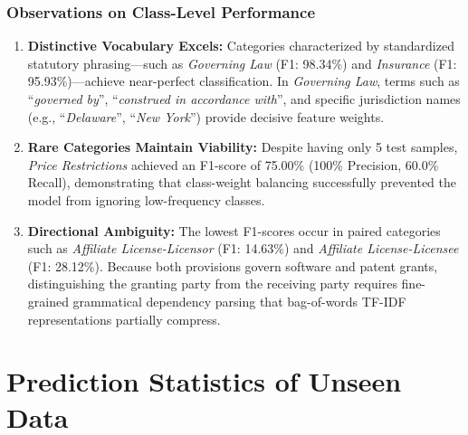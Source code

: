 \subsubsection*{Observations on Class-Level Performance}
\begin{enumerate}
    \item \textbf{Distinctive Vocabulary Excels:} Categories characterized by standardized statutory phrasing—such as \textit{Governing Law} (F1: 98.34\%) and \textit{Insurance} (F1: 95.93\%)—achieve near-perfect classification. In \textit{Governing Law}, terms such as ``\textit{governed by}'', ``\textit{construed in accordance with}'', and specific jurisdiction names (e.g., ``\textit{Delaware}'', ``\textit{New York}'') provide decisive feature weights.
    \item \textbf{Rare Categories Maintain Viability:} Despite having only 5 test samples, \textit{Price Restrictions} achieved an F1-score of 75.00\% (100\% Precision, 60.0\% Recall), demonstrating that class-weight balancing successfully prevented the model from ignoring low-frequency classes.
    \item \textbf{Directional Ambiguity:} The lowest F1-scores occur in paired categories such as \textit{Affiliate License-Licensor} (F1: 14.63\%) and \textit{Affiliate License-Licensee} (F1: 28.12\%). Because both provisions govern software and patent grants, distinguishing the granting party from the receiving party requires fine-grained grammatical dependency parsing that bag-of-words TF-IDF representations partially compress.
\end{enumerate}

\section{Prediction Statistics of Unseen Data}
\label{sec:prediction_statistics_unseen}

